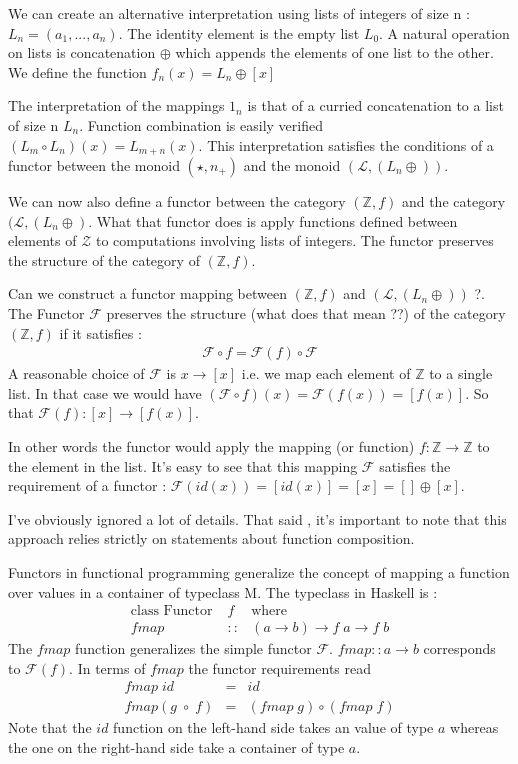 \documentclass[12pt,fleqn]{article}
\begin{document}
We can create an alternative interpretation using lists of integers of size n : $L_{n} = (a_1,...,a_{n})$. 
The identity element is the empty list $L_0$.
A natural operation on lists is concatenation $\oplus$ which appends the elements of one list to the other.
We define the function $f_{n} (x) = L_{n} \oplus [x]$

The interpretation of the mappings $1_n$ is that of a curried concatenation to a list of size n $L_{n}$.
Function combination is easily verified $(L_m \circ L_n)(x) = L_{m+n} (x)$.
This interpretation satisfies the conditions of a functor between the monoid $(\star, n_+)$ and the monoid $(\mathcal{L},(L_n \oplus ))$.

We can now also define a functor between the category $(\mathbb{Z}, f)$ and the category $(\mathcal{L}, (L_n \oplus)$.
What that functor does is apply functions defined between elements of $\mathcal{Z}$ to computations involving lists of integers.
The functor preserves the structure of the category of $(\mathbb{Z}, f)$.

Can we construct a functor mapping between $(\mathbb{Z}, f)$ and $(\mathcal{L}, (L_n \oplus ))$ ?.
The Functor $\mathcal{F}$ preserves the structure (what does that mean ??) of the category $(\mathbb{Z}, f)$ if it satisfies :
\begin{eqnarray*}
\mathcal{F} \circ f = \mathcal{F}(f) \circ \mathcal{F} 
\end{eqnarray*}
A reasonable choice of $\mathcal{F}$ is $x \rightarrow [x]$ i.e. we map each element of $\mathbb{Z}$ to a single list.
In that case we would have $(\mathcal{F} \circ f)(x) = \mathcal{F}(f(x)) = [f(x)]$.
So that $\mathcal{F}(f) : [x] \rightarrow [f(x)]$.

In other words the functor would apply the mapping (or function) $f : \mathbb{Z} \rightarrow \mathbb{Z}$ to the element in the list.
It's easy to see that this mapping $\mathcal{F}$ satisfies the requirement of a functor : $\mathcal{F} (id(x)) = [id(x)] = [x] = [] \oplus [x]$.


I've obviously ignored a lot of details.
That said , it's important to note that this approach relies strictly on statements about function composition.


Functors in functional programming generalize the concept of mapping a function over values in a container of typeclass M.
The typeclass in Haskell is :
\begin{eqnarray*}
\mbox{class Functor}\; &f& \mbox{where} \\
fmap &::& (a \rightarrow b) \rightarrow f\;a \rightarrow f\;b
\end{eqnarray*}
The $fmap$ function generalizes the simple functor $\mathcal{F}$. 
$fmap::a \rightarrow b$ corresponds to $\mathcal{F}(f)$.
In terms of $fmap$ the functor requirements read 
\begin{eqnarray*}
fmap \; id &=& id  \\
fmap (g \; \circ \; f) &=& (fmap \;g) \circ (fmap \;f) 
\end{eqnarray*}
Note that the $id$ function on the left-hand side takes an value of type $a$ whereas the one on the right-hand side take a container of type $a$.
\end{document}
